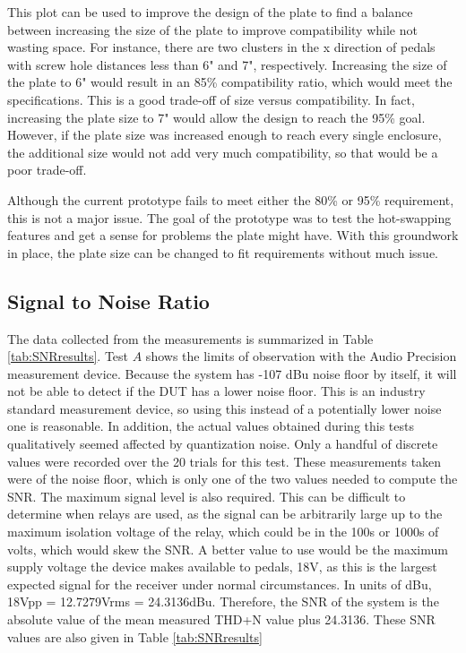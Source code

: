 \documentclass{article}
\begin{document}
	This plot can be used to improve the design of the plate to find a balance between increasing the size of the plate to improve compatibility while not wasting space.  For instance, there are two clusters in the x direction of pedals with screw hole distances less than 6" and 7", respectively.  Increasing the size of the plate to 6" would result in an 85\% compatibility ratio, which would meet the specifications.  This is a good trade-off of size versus compatibility.  In fact, increasing the plate size to 7" would allow the design to reach the 95\% goal.  However, if the plate size was increased enough to reach every single enclosure, the additional size would not add very much compatibility, so that would be a poor trade-off.

	Although the current prototype fails to meet either the 80\% or 95\% requirement, this is not a major issue.  The goal of the prototype was to test the hot-swapping features and get a sense for problems the plate might have.  With this groundwork in place, the plate size can be changed to fit requirements without much issue.

	\subsection{Signal to Noise Ratio}
	The data collected from the measurements is summarized in Table \ref{tab:SNRresults}.  Test $A$ shows the limits of observation with the Audio Precision measurement device.  Because the system has -107 dBu noise floor by itself, it will not be able to detect if the DUT has a lower noise floor.  This is an industry standard measurement device, so using this instead of a potentially lower noise one is reasonable.  In addition, the actual values obtained during this tests qualitatively seemed affected by quantization noise.  Only a handful of discrete values were recorded over the 20 trials for this test.  These measurements taken were of the noise floor, which is only one of the two values needed to compute the SNR.  The maximum signal level is also required.  This can be difficult to determine when relays are used, as the signal can be arbitrarily large up to the maximum isolation voltage of the relay, which could be in the 100s or 1000s of volts, which would skew the SNR.  A better value to use would be the maximum supply voltage the device makes available to pedals, 18V, as this is the largest expected signal for the receiver under normal circumstances.  In units of dBu, 18Vpp = 12.7279Vrms = 24.3136dBu.  Therefore, the SNR of the system is the absolute value of the mean measured THD+N value plus 24.3136.  These SNR values are also given in Table \ref{tab:SNRresults}
\end{document}
